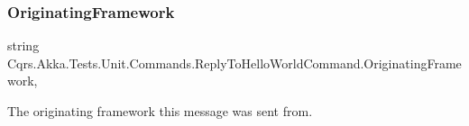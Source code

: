 \subsubsection{\texorpdfstring{Originating\+Framework}{OriginatingFramework}}
{\footnotesize\ttfamily string Cqrs.\+Akka.\+Tests.\+Unit.\+Commands.\+Reply\+To\+Hello\+World\+Command.\+Originating\+Framework\hspace{0.3cm}{\ttfamily [get]}, {\ttfamily [set]}}



The originating framework this message was sent from. 

